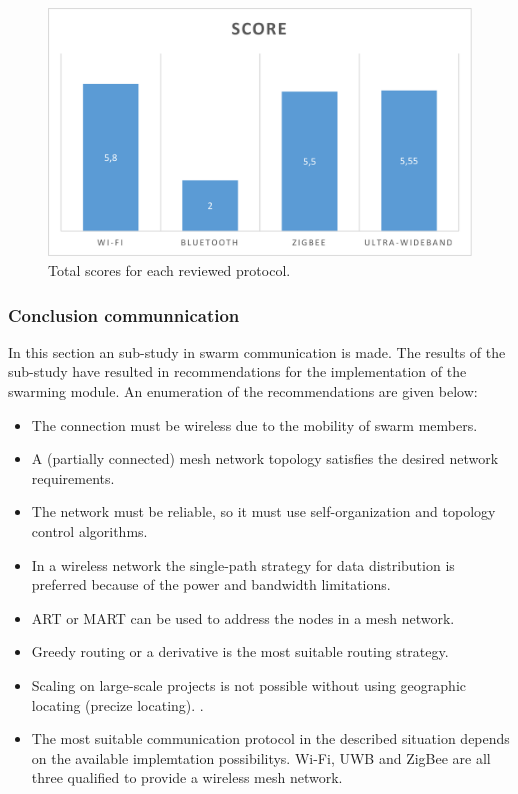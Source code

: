 \documentclass[10pt,a4paper]{article}
\begin{document}
\begin{figure}[H]
   \centering
   \includegraphics[width=1\textwidth]{protocolcomparison}
   \caption{Total scores for each reviewed protocol.}
   \label{fig:protocolcomparison}
\end{figure}


\newpage
\subsubsection{Conclusion communnication}
In this section an sub-study in swarm communication is made. The results of the sub-study have resulted in recommendations for the implementation of the swarming module. An enumeration of the recommendations are given below:
\begin{itemize}
\setlength\itemsep{0em}
    \item The connection must be wireless due to the mobility of swarm members.
    \item A (partially connected) mesh network topology satisfies the desired network requirements.
    \item The network must be reliable, so it must use self-organization and topology control algorithms. \cite{WMN1}
    \item In a wireless network the single-path strategy for data distribution is preferred because of the power and bandwidth limitations. \cite{position-based}
    \item ART or MART can be used to address the nodes in a mesh network.
    \item Greedy routing or a derivative is the most suitable routing strategy.
    \item Scaling on large-scale projects is not possible without using geographic locating (precize locating). \cite{geographicalrouting}\cite{scalablelocation}. 
    \item The most suitable communication protocol in the described situation depends on the available implemtation possibilitys. Wi-Fi, UWB and ZigBee are all three qualified to provide a wireless mesh network.
\end{itemize}
\end{document}
